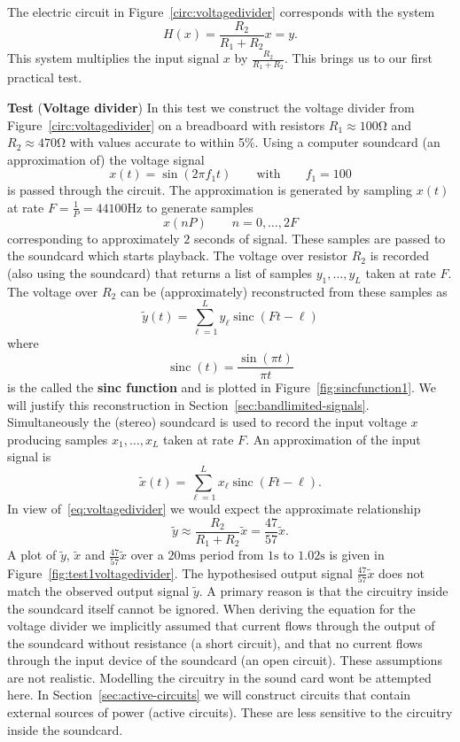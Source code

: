\documentclass[11pt,a4paper]{book}
\theoremstyle{plain}
\numberwithin{equation}{section}
\newcommand{\term}{\textbf}
\newcounter{test}
\newenvironment{test}{
\begin{shaded}\refstepcounter{test}\par\noindent%
\textbf{Test \thetest}
}{
\end{shaded}
}
\begin{document}
The electric circuit in Figure~\ref{circ:voltagedivider} corresponds with the system
\[
H(x) = \frac{R_2}{R_1 + R_2} x = y.
\]
This system multiplies the input signal $x$ by $\frac{R_2}{R_1 + R_2}$.  This brings us to our first practical test.

\newcommand{\sinc}{\operatorname{sinc}}
\begin{test}\label{test:voltagedividertest1}
(\textbf{Voltage divider})
In this test we construct the voltage divider from Figure~\ref{circ:voltagedivider} on a breadboard with resistors $R_1 \approx 100\si{\ohm}$ and $R_2 \approx 470\si{\ohm}$ with values accurate to within 5\%.  Using a computer soundcard (an approximation of) the voltage signal 
\[
x(t) = \sin( 2 \pi f_1 t) \qquad  \text{with} \qquad  f_1 = 100
\] 
is passed through the circuit.  The approximation is generated by sampling $x(t)$ at rate $F = \frac{1}{P} = 44100\si{\hertz}$ to generate samples 
\[
x(n P) \qquad n = 0, \dots, 2 F
\]
corresponding to approximately $2$ seconds of signal.  These samples are passed to the soundcard which starts playback.  The voltage over resistor $R_2$ is recorded (also using the soundcard) that returns a list of samples $y_1,\dots,y_L$ taken at rate $F$.  The voltage over $R_2$ can be (approximately) reconstructed from these samples as
\begin{equation}\label{eq:yreconstruct}
\tilde{y}(t) = \sum_{\ell=1}^L y_\ell \sinc( F t - \ell )
\end{equation}
where
\begin{equation}\label{eq:sincfunction}
\sinc(t) = \frac{\sin(\pi t)}{\pi t}
\end{equation}
is the called the \term{sinc function} and is plotted in Figure~\ref{fig:sincfunction1}. We will justify this reconstruction in Section~\ref{sec:bandlimited-signals}.  Simultaneously the (stereo) soundcard is used to record the input voltage $x$ producing samples $x_1,\dots,x_L$ taken at rate $F$.  An approximation of the input signal is  
\begin{equation}\label{eq:xreconstruct}
\tilde{x}(t) = \sum_{\ell=1}^L x_\ell \sinc( F t - \ell ).
\end{equation}
In view of~\eqref{eq:voltagedivider} we would expect the approximate relationship
\[
\tilde{y} \approx \frac{R_2}{R_1 + R_2} \tilde{x} = \frac{47}{57}\tilde{x}.
\]
A plot of $\tilde{y}$, $\tilde{x}$ and $\tfrac{47}{57}\tilde{x}$ over a $20\si{\milli\second}$ period from $1\si{\second}$ to $1.02\si{\second}$ is given in Figure~\ref{fig:test1voltagedivider}.  The hypothesised output signal $\tfrac{47}{57}\tilde{x}$ does not match the observed output signal $\tilde{y}$.  A primary reason is that the circuitry inside the soundcard itself cannot be ignored.  When deriving the equation for the voltage divider we implicitly assumed that current flows through the output of the soundcard without resistance (a short circuit), and that no current flows through the input device of the soundcard (an open circuit).  These assumptions are not realistic.  Modelling the circuitry in the sound card wont be attempted here.  In Section~\ref{sec:active-circuits} we will construct circuits that contain external sources of power (active circuits).  These are less sensitive to the circuitry inside the soundcard.  


\end{test}
\end{document}
